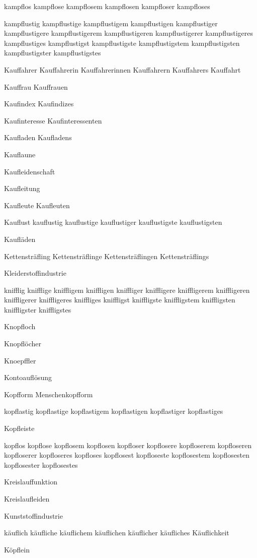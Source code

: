 kampflos kampflose kampflosem kampflosen kampfloser kampfloses

kampflustig kampflustige kampflustigem kampflustigen kampflustiger kampflustigere kampflustigerem kampflustigeren kampflustigerer kampflustigeres kampflustiges kampflustigst kampflustigste kampflustigstem kampflustigsten kampflustigster kampflustigstes

Kauffahrer Kauffahrerin Kauffahrerinnen Kauffahrern Kauffahrers
Kauffahrt

Kauffrau Kauffrauen

Kaufindex Kaufindizes

Kaufinteresse Kaufinteressenten

Kaufladen Kaufladens

Kauflaune

Kaufleidenschaft

Kaufleitung

Kaufleute Kaufleuten

Kauflust kauflustig kauflustige kauflustiger kauflustigste kauflustigsten

Kaufläden

Kettensträfling Kettensträflinge Kettensträflingen Kettensträflings

Kleiderstoffindustrie

knifflig knifflige kniffligem kniffligen kniffliger kniffligere kniffligerem kniffligeren kniffligerer kniffligeres kniffliges kniffligst kniffligste kniffligstem kniffligsten kniffligster kniffligstes

Knopfloch

Knopflöcher

Knoepffler

Kontoauflösung

Kopfform Menschenkopfform

kopflastig kopflastige kopflastigem kopflastigen kopflastiger kopflastiges

Kopfleiste

kopflos kopflose kopflosem kopflosen kopfloser kopflosere kopfloserem kopfloseren kopfloserer kopfloseres kopfloses kopflosest kopfloseste kopflosestem kopflosesten kopflosester kopflosestes

Kreislauffunktion

Kreislaufleiden

Kunststoffindustrie

käuflich käufliche käuflichem käuflichen käuflicher käufliches Käuflichkeit

Köpflein

